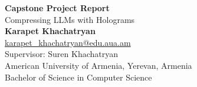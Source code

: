 \documentclass{article}
\begin{document}
	\begin{center}
    
    	\LARGE{\textbf{Capstone Project Report}} \\
        \vspace{1em}
        \Large{Compressing LLMs with Holograms} \\
        \vspace{1em}
        \normalsize\textbf{Karapet Khachatryan} \\
        \normalsize{\href{mailto:karapet_khachatryan@edu.aua.am}{karapet\_khachatryan@edu.aua.am}} \\
        \vspace{1em}
        \normalsize{Supervisor: Suren Khachatryan} \\
        \vspace{1em}
        \normalsize{American University of Armenia, Yerevan, Armenia} \\
        \normalsize{Bachelor of Science in Computer Science}
    
	\end{center}
\end{document}
